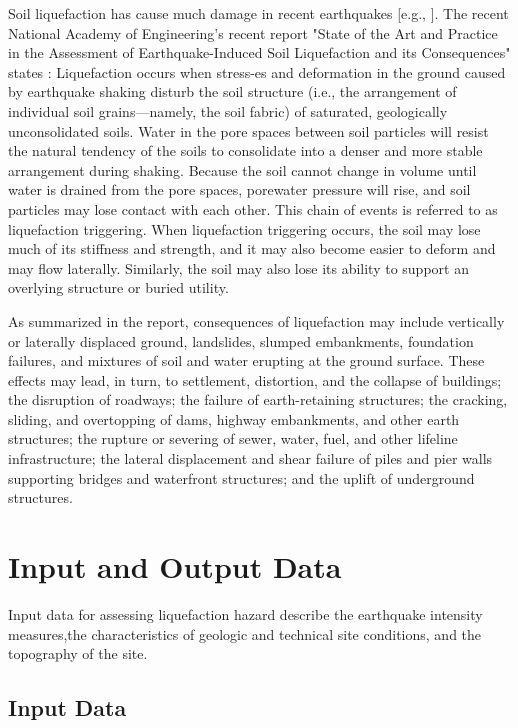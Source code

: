 Soil liquefaction has cause much damage in recent earthquakes [e.g., \cite{cubrinovski2011geotechnical,cubrinovski2017liquefaction,bray2017new}]. The recent National Academy of Engineering’s recent report "State of the Art and Practice in the Assessment of Earthquake-Induced Soil Liquefaction and its Consequences" states \citep{national2016state}: Liquefaction occurs when stress-es and deformation in the ground caused by earthquake shaking disturb the soil structure (i.e., the arrangement of individual soil grains—namely, the soil fabric) of saturated, geologically unconsolidated soils. Water in the pore spaces between soil particles will resist the natural tendency of the soils to consolidate into a denser and more stable arrangement during shaking. Because the soil cannot change in volume until water is drained from the pore spaces, porewater pressure will rise, and soil particles may lose contact with each other. This chain of events is referred to as liquefaction triggering. When liquefaction triggering occurs, the soil may lose much of its stiffness and strength, and it may also become easier to deform and may flow laterally. Similarly, the soil may also lose its ability to support an overlying structure or buried utility. 

As summarized in the \cite{national2016state} report, consequences of liquefaction may include vertically or laterally displaced ground, landslides, slumped embankments, foundation failures, and mixtures of soil and water erupting at the ground surface. These effects may lead, in turn, to settlement, distortion, and the collapse of buildings; the disruption of roadways; the failure of earth-retaining structures; the cracking, sliding, and overtopping of dams, highway embankments, and other earth structures; the rupture or severing of sewer, water, fuel, and other lifeline infrastructure; the lateral displacement and shear failure of piles and pier walls supporting bridges and waterfront structures; and the uplift of underground structures.

\section{Input and Output Data}

Input data for assessing liquefaction hazard describe the earthquake intensity measures,the characteristics of geologic and technical site conditions, and the topography of the site.

\subsection{Input Data}
\label{subsec:eq_liquefaction_input}

